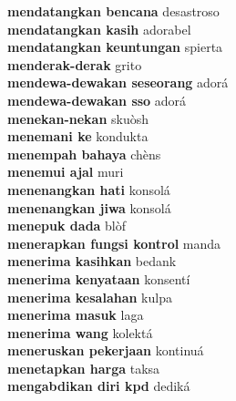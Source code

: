\textbf{ mendatangkan bencana  } desastroso \\
\textbf{ mendatangkan kasih  } adorabel \\
\textbf{ mendatangkan keuntungan  } spierta \\
\textbf{ menderak-derak  } grito \\
\textbf{ mendewa-dewakan seseorang  } adorá \\
\textbf{ mendewa-dewakan sso  } adorá \\
\textbf{ menekan-nekan  } skuòsh \\
\textbf{ menemani ke  } kondukta \\
\textbf{ menempah bahaya  } chèns \\
\textbf{ menemui ajal  } muri \\
\textbf{ menenangkan hati  } konsolá \\
\textbf{ menenangkan jiwa  } konsolá \\
\textbf{ menepuk dada  } blòf \\
\textbf{ menerapkan fungsi kontrol  } manda \\
\textbf{ menerima kasihkan  } bedank \\
\textbf{ menerima kenyataan  } konsentí \\
\textbf{ menerima kesalahan  } kulpa \\
\textbf{ menerima masuk  } laga \\
\textbf{ menerima wang  } kolektá \\
\textbf{ meneruskan pekerjaan  } kontinuá \\
\textbf{ menetapkan harga  } taksa \\
\textbf{ mengabdikan diri kpd  } dediká \\
